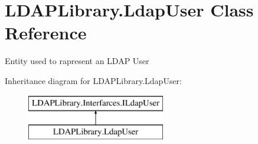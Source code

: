 \hypertarget{class_l_d_a_p_library_1_1_ldap_user}{}\section{L\+D\+A\+P\+Library.\+Ldap\+User Class Reference}
\label{class_l_d_a_p_library_1_1_ldap_user}


Entity used to rapresent an L\+D\+A\+P User  


Inheritance diagram for L\+D\+A\+P\+Library.\+Ldap\+User\+:\begin{figure}[H]
\begin{center}
\leavevmode
\includegraphics[height=2.000000cm]{class_l_d_a_p_library_1_1_ldap_user}
\end{center}
\end{figure}
